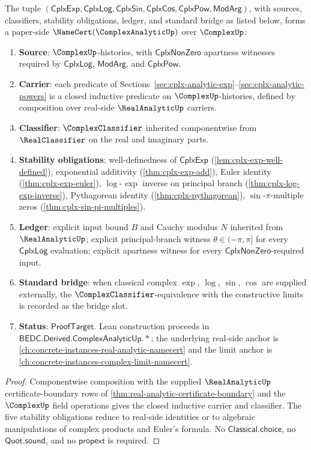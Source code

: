 \begin{theorem}
\label{thm:concrete-cplx-analytic-namecert}
The tuple \((\mathsf{CplxExp}, \mathsf{CplxLog}, \mathsf{CplxSin}, \mathsf{CplxCos}, \mathsf{CplxPow}, \mathsf{ModArg})\), with sources, classifiers, stability obligations, ledger, and standard bridge as listed below, forms a paper-side \(\NameCert(\ComplexAnalyticUp)\) over \(\ComplexUp\):
\begin{enumerate}
  \item \textbf{Source}: \(\ComplexUp\)-histories, with \(\mathsf{CplxNonZero}\) apartness witnesses required by \(\mathsf{CplxLog}\), \(\mathsf{ModArg}\), and \(\mathsf{CplxPow}\).
  \item \textbf{Carrier}: each predicate of Sections~\ref{sec:cplx-analytic-exp}--\ref{sec:cplx-analytic-powers} is a closed inductive predicate on \(\ComplexUp\)-histories, defined by composition over real-side \(\RealAnalyticUp\) carriers.
  \item \textbf{Classifier}: \(\ComplexClassifier\) inherited componentwise from \(\RealClassifier\) on the real and imaginary parts.
  \item \textbf{Stability obligations}: well-definedness of \(\mathsf{CplxExp}\) (\autoref{lem:cplx-exp-well-defined}), exponential additivity (\autoref{thm:cplx-exp-add}), Euler identity (\autoref{thm:cplx-exp-euler}), \(\log\)-\(\exp\) inverse on principal branch (\autoref{thm:cplx-log-exp-inverse}), Pythagorean identity (\autoref{thm:cplx-pythagorean}), \(\sin\)-\(\pi\)-multiple zeros (\autoref{thm:cplx-sin-pi-multiples}).
  \item \textbf{Ledger}: explicit input bound \(B\) and Cauchy modulus \(N\) inherited from \(\RealAnalyticUp\); explicit principal-branch witness \(\theta \in (-\pi, \pi]\) for every \(\mathsf{CplxLog}\) evaluation; explicit apartness witness for every \(\mathsf{CplxNonZero}\)-required input.
  \item \textbf{Standard bridge}: when classical complex \(\exp\), \(\log\), \(\sin\), \(\cos\) are supplied externally, the \(\ComplexClassifier\)-equivalence with the constructive limits is recorded as the bridge slot.
  \item \textbf{Status}: \(\mathsf{ProofTarget}\). Lean construction proceeds in \(\mathsf{BEDC.Derived.ComplexAnalyticUp.*}\); the underlying real-side anchor is \autoref{ch:concrete-instances-real-analytic-namecert} and the limit anchor is \autoref{ch:concrete-instances-complex-limit-namecert}.
\end{enumerate}
\end{theorem}
\begin{proof}
Componentwise composition with the supplied $\RealAnalyticUp$ certificate-boundary rows of \autoref{thm:real-analytic-certificate-boundary} and the $\ComplexUp$ field operations gives the closed inductive carrier and classifier. The five stability obligations reduce to real-side identities or to algebraic manipulations of complex products and Euler's formula. No $\mathsf{Classical.choice}$, no $\mathsf{Quot.sound}$, and no $\mathsf{propext}$ is required.
\end{proof}

